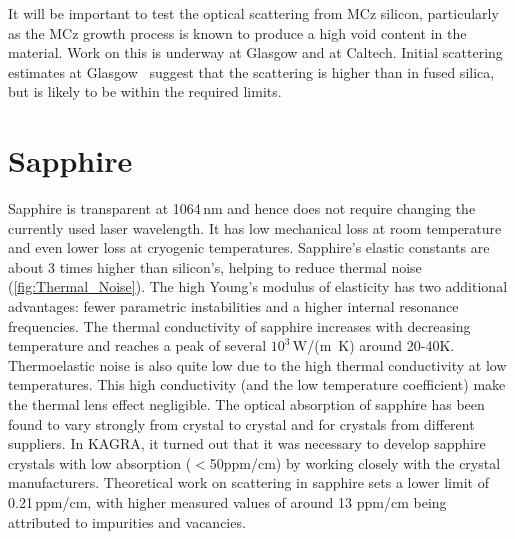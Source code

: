 
It will be important to test the optical scattering from MCz silicon, particularly as the MCz growth process is known to produce a high void content in the material. Work on this is underway at Glasgow and at Caltech. Initial scattering estimates at Glasgow~\cite{SiliconScatter2017} suggest that the scattering is higher than in fused silica, but is likely to be within the required limits.

\section{Sapphire}
Sapphire is transparent at 1064\,nm and hence does not require changing the currently used laser wavelength. It has low mechanical loss at room temperature~\cite{Rowan_2000a} and even lower loss at cryogenic temperatures\cite{uchiyama1999mechanical}. 
Sapphire's elastic constants are about 3 times higher than silicon's, helping to reduce thermal noise (\ref{fig:Thermal_Noise}). The high Young's modulus of elasticity has two additional advantages: fewer parametric instabilities and a higher internal resonance frequencies. The thermal conductivity of sapphire increases with decreasing temperature and reaches a peak of several $10^3$\,W/(m \,K) around 20-40K.  Thermoelastic noise is also quite low due to the high thermal conductivity at low temperatures.  This high conductivity (and the low temperature coefficient) make the thermal lens effect negligible. 
The optical absorption of sapphire has been found to vary strongly from crystal to crystal and for crystals from different suppliers. %
In KAGRA, it turned out that it was necessary to develop sapphire crystals with low absorption ($<$50ppm/cm) by working closely with the crystal manufacturers. 
Theoretical work on scattering in sapphire sets a lower limit of 0.21\,ppm/cm, with higher measured values of around 13 ppm/cm being attributed to impurities and vacancies.
